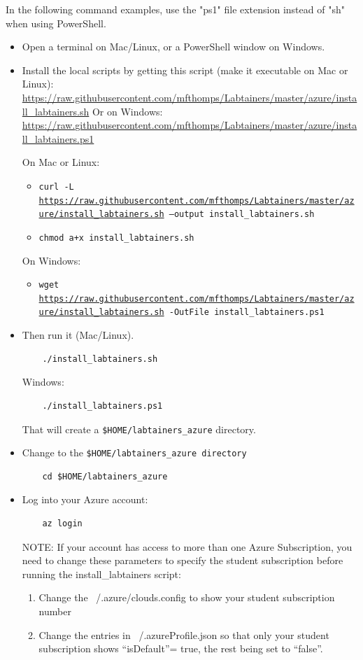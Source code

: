 \documentclass[12pt]{article}
\begin{document}
In the following command examples, use the "ps1" file extension instead of "sh" when using PowerShell.
\begin{itemize}
\item Open a terminal on Mac/Linux, or a PowerShell window on Windows.
\item Install the local scripts by getting this script (make it executable on Mac or Linux):
\url{https://raw.githubusercontent.com/mfthomps/Labtainers/master/azure/install\_labtainers.sh}
Or on Windows:
\url{https://raw.githubusercontent.com/mfthomps/Labtainers/master/azure/install\_labtainers.ps1}

On Mac or Linux:
\begin{itemize}
\item {\tt curl -L \url{https://raw.githubusercontent.com/mfthomps/Labtainers/master/azure/install\_labtainers.sh}  --output install\_labtainers.sh}
\item  {\tt chmod a+x install\_labtainers.sh}
\end{itemize}
\noindent On Windows:
\begin{itemize}
\item {\tt wget \url{https://raw.githubusercontent.com/mfthomps/Labtainers/master/azure/install\_labtainers.sh} -OutFile install\_labtainers.ps1}
\end{itemize}

\item Then run it (Mac/Linux).   
\begin{verbatim}
    ./install_labtainers.sh
\end{verbatim}
\noindent Windows:
\begin{verbatim}
    ./install_labtainers.ps1
\end{verbatim}

\noindent That will create a {\tt \$HOME/labtainers\_azure} directory.  

\item Change to the {\tt \$HOME/labtainers\_azure directory}
\begin{verbatim}
    cd $HOME/labtainers_azure
\end{verbatim}

\item Log into your Azure account:
\begin{verbatim}
    az login
\end{verbatim}
NOTE:  If your account has access to more than one Azure Subscription, you need to change these parameters to 
specify the student subscription before running the install\_labtainers script:
\begin{enumerate}
\item Change the  ~/.azure/clouds.config to show your student subscription number
\item Change the entries in ~/.azureProfile.json so that only your student subscription shows 
       ``isDefault''= true, the rest being set to ``false''.
\end{enumerate}


\end{itemize}
\end{document}
